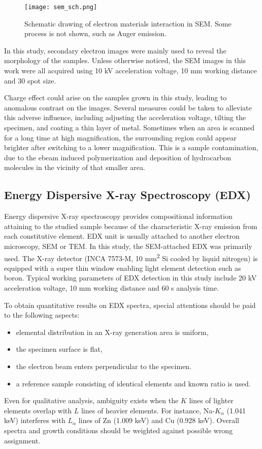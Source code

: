 \begin{figure}[htb]
\centering
\texttt{[image: sem\_sch.png]}
\caption[Schematic drawing of electron materials interaction in SEM]{Schematic drawing of electron materials interaction in SEM. Some process is not shown, such as Auger emission.}
\label{fig:ch2sem}
\end{figure}

In this study, secondary electron images were mainly used to reveal the morphology of the samples. Unless otherwise noticed, the SEM images in this work were all acquired using 10 kV acceleration voltage, 10 mm working distance and 30 spot size.

Charge effect could arise on the samples grown in this study, leading to anomalous contrast on the images. Several measures could be taken to alleviate this adverse influence, including adjusting the acceleration voltage, tilting the specimen, and coating a thin layer of metal. Sometimes when an area is scanned for a long time at high magnification, the surrounding region could appear brighter after switching to a lower magnification. This is a sample contamination, due to the \gls{ebeam} induced polymerization and deposition of hydrocarbon molecules in the vicinity of that smaller area. 


\subsection{Energy Dispersive X-ray Spectroscopy (EDX)}\label{sec:edx}

Energy dispersive X-ray spectroscopy provides compositional information attaining to the studied sample because of the characteristic X-ray emission from each constitutive element. EDX unit is usually attached to another electron microscopy, SEM or TEM. In this study, the SEM-attached EDX was primarily used. The X-ray detector (INCA 7573-M, 10 \si{mm^2} Si cooled by liquid nitrogen) is equipped with a super thin window enabling light element detection such as boron. Typical working parameters of EDX detection in this study include 20 kV acceleration voltage, 10 mm working distance and 60 s analysis time.

To obtain quantitative results on EDX spectra, special attentions should be paid to the following aspects:
\begin{itemize}
\item elemental distribution in an X-ray generation area is uniform,
\item the specimen surface is flat,
\item the electron beam enters perpendicular to the specimen. 
\item a reference sample consisting of identical elements and known ratio is used. 
\end{itemize}
Even for qualitative analysis, ambiguity exists when the $K$ lines of lighter elements overlap with $L$ lines of heavier elements. For instance, Na-$K_\alpha$ (1.041 keV) interferes with $L_\alpha$ lines of Zn (1.009 keV) and Cu (0.928 keV). Overall spectra and growth conditions should be weighted against possible wrong assignment. 

